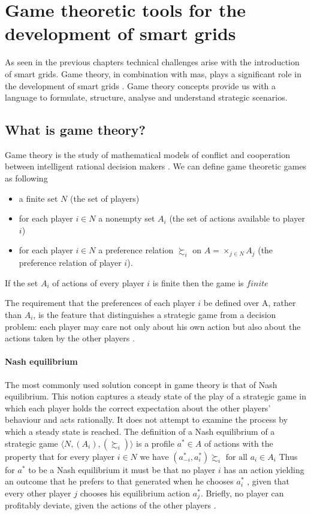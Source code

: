 \section{Game theoretic tools for the development of smart grids}
As seen in the previous chapters technical challenges arise with the introduction of smart grids. Game theory, in combination with \ac{mas}, plays a significant role in the development of smart grids \cite{keypaper}. Game theory concepts provide us with a language to formulate, structure, analyse and understand strategic scenarios.

\subsection{What is game theory?}

Game theory is the study of mathematical models of conflict and cooperation between intelligent rational decision makers \cite{myerson2013game}. 
We can define game theoretic games as following
\begin{itemize}
    \item a finite set $N$ (the set of players)
    \item for each player $i \in N$ a nonempty set $A_i$ (the set of actions available to player $i$)
    \item for each player $i \in N$ a preference relation $\succsim_i$ on $A = \times_{j \in N}A_j$ (the preference relation of player $i$).
\end{itemize}
If the set $A_i$ of actions of every player $i$ is finite then the game is $finite$

The requirement that the preferences of each player $i$ be defined over A, rather than $A_{i}$, is the feature that distinguishes a strategic game from a decision problem: each player may care not only about his own action but also about the actions taken by the other players  \cite{CourseInGameTheory}.

\paragraph{Nash equilibrium} 
The most commonly used solution concept in game theory is that of Nash equilibrium. This notion captures a steady state of the play of a strategic game in which each player holds the correct expectation about the other players’ behaviour and acts rationally. It does not attempt to examine the process by which a steady state is reached.
The definition of a Nash equilibrium of a strategic game $\langle N, (A_i), (\succsim_i) \rangle $ is a profile $a^{*} \in A$ of actions with the property that for every player $i \in N$ we have $(a^{*}_{-i}, a^{*}_{i}) \succsim_i \mbox{ for all } a_i \in A_i$
Thus for $a^*$ to be a Nash equilibrium it must be that no player $i$ has an action yielding an outcome that he prefers to that generated when he chooses $a_i^*$ , given that every other player $j$ chooses his equilibrium action $a^*_j$. Briefly, no player can profitably deviate, given the actions of the other players \cite{CourseInGameTheory}.

